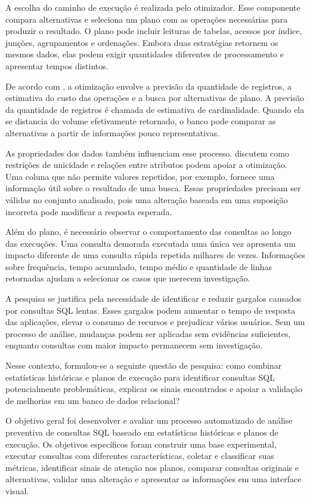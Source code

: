 \documentclass{UNESC}
\begin{document}
A escolha do caminho de execução é realizada pelo otimizador. Esse componente compara alternativas e seleciona um plano com as operações necessárias para produzir o resultado. O plano pode incluir leituras de tabelas, acessos por índice, junções, agrupamentos e ordenações. Embora duas estratégias retornem os mesmos dados, elas podem exigir quantidades diferentes de processamento e apresentar tempos distintos.

De acordo com , a otimização envolve a previsão da quantidade de registros, a estimativa do custo das operações e a busca por alternativas de plano. A previsão da quantidade de registros é chamada de estimativa de cardinalidade. Quando ela se distancia do volume efetivamente retornado, o banco pode comparar as alternativas a partir de informações pouco representativas.

As propriedades dos dados também influenciam esse processo.  discutem como restrições de unicidade e relações entre atributos podem apoiar a otimização. Uma coluna que não permite valores repetidos, por exemplo, fornece uma informação útil sobre o resultado de uma busca. Essas propriedades precisam ser válidas no conjunto analisado, pois uma alteração baseada em uma suposição incorreta pode modificar a resposta esperada.

Além do plano, é necessário observar o comportamento das consultas ao longo das execuções. Uma consulta demorada executada uma única vez apresenta um impacto diferente de uma consulta rápida repetida milhares de vezes. Informações sobre frequência, tempo acumulado, tempo médio e quantidade de linhas retornadas ajudam a selecionar os casos que merecem investigação.

A pesquisa se justifica pela necessidade de identificar e reduzir gargalos causados por consultas SQL lentas. Esses gargalos podem aumentar o tempo de resposta das aplicações, elevar o consumo de recursos e prejudicar vários usuários. Sem um processo de análise, mudanças podem ser aplicadas sem evidências suficientes, enquanto consultas com maior impacto permanecem sem investigação.

Nesse contexto, formulou-se a seguinte questão de pesquisa: como combinar estatísticas históricas e planos de execução para identificar consultas SQL potencialmente problemáticas, explicar os sinais encontrados e apoiar a validação de melhorias em um banco de dados relacional?

O objetivo geral foi desenvolver e avaliar um processo automatizado de análise preventiva de consultas SQL baseado em estatísticas históricas e planos de execução. Os objetivos específicos foram construir uma base experimental, executar consultas com diferentes características, coletar e classificar suas métricas, identificar sinais de atenção nos planos, comparar consultas originais e alternativas, validar uma alteração e apresentar as informações em uma interface visual.
\end{document}
